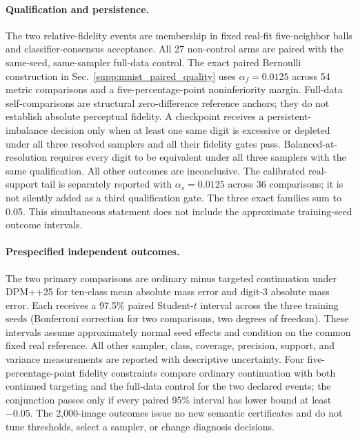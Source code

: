 \paragraph{Qualification and persistence.}
The two relative-fidelity events are membership in fixed real-fit
five-neighbor balls and classifier-consensus acceptance. All 27 non-control
arms are paired with the same-seed, same-sampler full-data control. The exact
paired Bernoulli construction in Sec.~\ref{supp:mnist_paired_quality} uses $\alpha_f=0.0125$ across 54 metric
comparisons and a five-percentage-point noninferiority margin. Full-data
self-comparisons are structural zero-difference reference anchors; they do
not establish absolute perceptual fidelity. A checkpoint receives a
persistent-imbalance decision only when at least one same digit is excessive
or depleted under all three resolved samplers and all their fidelity gates
pass. Balanced-at-resolution requires every digit to be equivalent under
all three samplers with the same qualification. All other outcomes are
inconclusive. The calibrated real-support tail is separately reported with
$\alpha_s=0.0125$ across 36 comparisons; it is not silently added as a third
qualification gate. The three exact families sum to 0.05. This simultaneous
statement does not include the approximate training-seed outcome intervals.

\paragraph{Prespecified independent outcomes.}
The two primary comparisons are ordinary minus targeted continuation under
DPM++25 for ten-class mean absolute mass error and digit-3 absolute mass
error. Each receives a 97.5\% paired Student-$t$ interval across the three
training seeds (Bonferroni correction for two comparisons, two degrees of
freedom). These intervals assume approximately normal seed effects and
condition on the common fixed real reference. All other sampler, class,
coverage, precision, support, and variance measurements are reported with
descriptive uncertainty. Four five-percentage-point fidelity constraints
compare ordinary continuation with both continued targeting and the
full-data control for the two declared events; the conjunction passes only
if every paired 95\% interval has lower bound at least $-0.05$.
The 2,000-image outcomes issue no new semantic certificates and do not tune
thresholds, select a sampler, or change diagnosis decisions.

